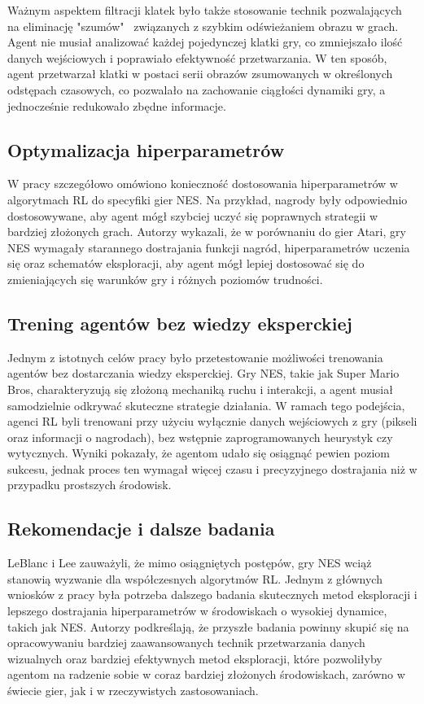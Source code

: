 Ważnym aspektem filtracji klatek było także stosowanie technik pozwalających na eliminację "szumów" \ związanych z szybkim odświeżaniem obrazu w grach. Agent nie musiał analizować każdej pojedynczej klatki gry, co zmniejszało ilość danych wejściowych i poprawiało efektywność przetwarzania. W ten sposób, agent przetwarzał klatki w postaci serii obrazów zsumowanych w określonych odstępach czasowych, co pozwalało na zachowanie ciągłości dynamiki gry, a jednocześnie redukowało zbędne informacje.

\subsection{Optymalizacja hiperparametrów}
W pracy \cite{NES} szczegółowo omówiono konieczność dostosowania hiperparametrów w algorytmach RL do specyfiki gier NES. Na przykład, nagrody były odpowiednio dostosowywane, aby agent mógł szybciej uczyć się poprawnych strategii w bardziej złożonych grach. Autorzy wykazali, że w porównaniu do gier Atari, gry NES wymagały starannego dostrajania funkcji nagród, hiperparametrów uczenia się oraz schematów eksploracji, aby agent mógł lepiej dostosować się do zmieniających się warunków gry i różnych poziomów trudności.

\subsection{Trening agentów bez wiedzy eksperckiej}
Jednym z istotnych celów pracy było przetestowanie możliwości trenowania agentów bez dostarczania wiedzy eksperckiej. Gry NES, takie jak Super Mario Bros, charakteryzują się złożoną mechaniką ruchu i interakcji, a agent musiał samodzielnie odkrywać skuteczne strategie działania. W ramach tego podejścia, agenci RL byli trenowani przy użyciu wyłącznie danych wejściowych z gry (pikseli oraz informacji o nagrodach), bez wstępnie zaprogramowanych heurystyk czy wytycznych. Wyniki pokazały, że agentom udało się osiągnąć pewien poziom sukcesu, jednak proces ten wymagał więcej czasu i precyzyjnego dostrajania niż w przypadku prostszych środowisk.

\subsection{Rekomendacje i dalsze badania}
LeBlanc i Lee \cite{NES} zauważyli, że mimo osiągniętych postępów, gry NES wciąż stanowią wyzwanie dla współczesnych algorytmów RL. Jednym z głównych wniosków z pracy była potrzeba dalszego badania skutecznych metod eksploracji i lepszego dostrajania hiperparametrów w środowiskach o wysokiej dynamice, takich jak NES. Autorzy podkreślają, że przyszłe badania powinny skupić się na opracowywaniu bardziej zaawansowanych technik przetwarzania danych wizualnych oraz bardziej efektywnych metod eksploracji, które pozwoliłyby agentom na radzenie sobie w coraz bardziej złożonych środowiskach, zarówno w świecie gier, jak i w rzeczywistych zastosowaniach.

